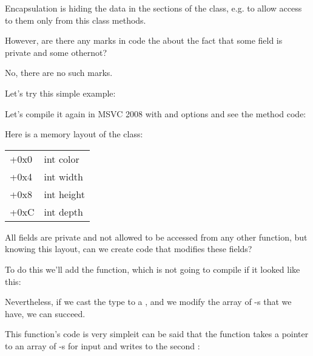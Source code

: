 
Encapsulation is hiding the data in the  sections of the class, 
e.g. to allow access to them only from this class methods.

However, are there any marks in code the about the fact that some field is private and
some other\EMDASH{}not?

No, there are no such marks.

Let's try this simple example:



Let's compile it again in MSVC 2008 with \Ox and \Obzero options and see the  method code:



Here is a memory layout of the class:

\begin{center}
\begin{tabular}{ | l | l | }
\hline
  \tableheader{} \\
\hline
  +0x0 & int color \\
\hline
  +0x4 & int width \\
\hline
  +0x8 & int height \\
\hline
  +0xC & int depth \\
\hline
\end{tabular}
\end{center}

All fields are private and not allowed to be accessed from any other
function, but knowing this layout, can we create code that modifies these fields? 

To do this we'll add the  function, 
which is not going to compile if it looked like this:



Nevertheless, if we cast the  type to a ,
and we modify the array of \Tint{}-s that we have, we can succeed.



This function's code is very simple\EMDASH{}it can be said that the function takes a pointer to an array of \Tint{}-s for input
and writes  to the second \Tint{}:



